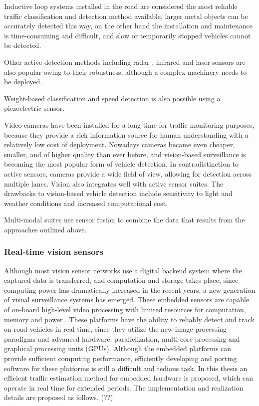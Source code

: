 Inductive loop systems installed in the road are considered the most reliable traffic classification and detection method available, larger metal objects can be accurately detected this way, on the other hand the installation and maintenance is time-consuming and difficult, and slow or temporarily stopped vehicles cannot be detected\cite{Diamond, Zhang2016}.

Other active detection methods including radar \cite{DeepBlue}, infrared \cite{Swarco, Hussain1995, Ghazal2016} and laser \cite{SICK, Gallego2009} sensors are also popular owing to their robustness, although a complex machinery needs to be deployed.

Weight-based classification and speed detection is also possible using a piezoelectric sensor\cite{Te, Rivas2017}.

Video cameras have been installed for a long time for traffic monitoring purposes, because they provide a rich information source for human understanding with a relatively low cost of deployment\cite{Tian2011, Buch2011, VideoSurveillance, LaSemaforica}.
Nowadays cameras became even cheaper, smaller, and of higher quality than ever before, and vision-based surveillance is becoming the most popular form of vehicle detection.
In contradistinction to active sensors, cameras provide a wide field of view, allowing for detection across multiple lanes. 
Vision also integrates well with active sensor suites.
The drawbacks to vision-based vehicle detection include sensitivity to light and weather conditions and increased computational cost\cite{Shivaraman2013}.

Multi-modal suites use sensor fusion to combine the data that results from the approaches outlined above\cite{Swarco}.

\subsubsection{Real-time vision sensors}
Although most vision sensor networks use a digital backend system where the captured data is transferred, and computation and storage takes place, since computing power has dramatically increased in the recent years, a new generation of visual surveillance systems has emerged.
These embedded sensors are capable of on-board high-level video processing with limited resources for computation, memory and power \cite{Bramberger2004}.
These platforms have the ability to reliably detect and track on-road vehicles in real time, since they utilize the new image-processing paradigms and advanced hardware: parallelization, multi-core processing and graphical processing units (GPUs)\cite{Sivaraman2013}.
Although the embedded platforms can provide sufficient computing performance, efficiently developing and porting software for these platforms is still a difficult and tedious task\cite{Bramberger2004}.
In this thesis an efficient traffic estimation method for embedded hardware is proposed, which can operate in real time for extended periods.
The implementation and realization details are proposed as follows. (??)

